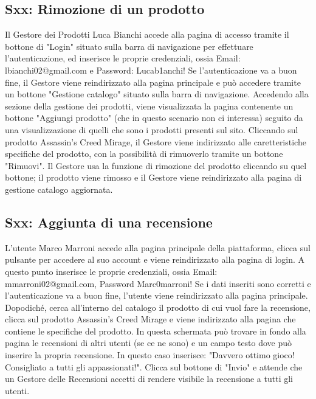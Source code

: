 \documentclass[12pt, a4paper, oneside]{book}
\begin{document}
    \subsection*{Sxx: Rimozione di un prodotto}
    Il Gestore dei Prodotti Luca Bianchi accede alla pagina di accesso tramite il bottone di "Login" situato sulla barra di navigazione per effettuare l'autenticazione, ed inserisce le proprie credenziali, ossia Email: lbianchi02@gmail.com e Password: Lucab1anchi!
    Se l'autenticazione va a buon fine, il Gestore viene reindirizzato alla pagina principale e può accedere tramite un bottone "Gestione catalogo" situato sulla barra di navigazione.
    Accedendo alla sezione della gestione dei prodotti, viene visualizzata la pagina contenente un bottone "Aggiungi prodotto" (che in questo scenario non ci interessa) seguito da una visualizzazione di quelli che sono i prodotti presenti sul sito.
    Cliccando sul prodotto Assassin's Creed Mirage, il Gestore viene indirizzato alle caretteristiche specifiche del prodotto, con la possibilità di rimuoverlo tramite un bottone "Rimuovi". Il Gestore usa la funzione di rimozione del prodotto cliccando su quel bottone; il prodotto viene rimosso e il Gestore viene reindirizzato alla pagina di gestione catalogo aggiornata.

    \subsection*{Sxx: Aggiunta di una recensione}
    L'utente Marco Marroni accede alla pagina principale della piattaforma, clicca sul pulsante per accedere al suo account e viene reindirizzato alla pagina di login. A questo punto inserisce le proprie credenziali, ossia Email: mmarroni02@gmail.com, Password Marc0marroni!
    Se i dati inseriti sono corretti e l'autenticazione va a buon fine, l'utente viene reindirizzato alla pagina principale.
    Dopodiché, cerca all'interno del catalogo il prodotto di cui vuol fare la recensione, clicca sul prodotto Assassin's Creed Mirage e viene indirizzato alla pagina che contiene le specifiche del prodotto. In questa schermata può trovare in fondo alla pagina le recensioni di altri utenti (se ce ne sono) e un campo testo dove può inserire la propria recensione. In questo caso inserisce: "Davvero ottimo gioco! Consigliato a tutti gli appassionati!". Clicca sul bottone di "Invio" e attende che un Gestore delle Recensioni accetti di rendere visibile la recensione a tutti gli utenti.
\end{document}
